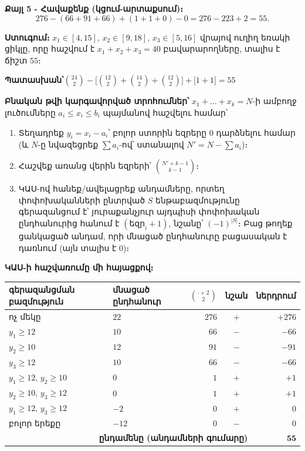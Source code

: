 \documentclass[11pt,a4paper]{article}
\newcommand{\answer}[1]{\begin{answerbox}\centering\textbf{Պատասխան՝}\quad #1\end{answerbox}}
\begin{document}
\textbf{Քայլ 5 - Հավաքենք (կցում-արտաքսում)։}
$$276-(66+91+66)+(1+1+0)-0=276-223+2=55.$$

\textbf{Ստուգում։} $x_1\in[4,15],\,x_2\in[9,18],\,x_3\in[5,16]$ վրայով ուղիղ եռակի ցիկլը, որը հաշվում
է $x_1+x_2+x_3=40$ բավարարողները, տալիս է ճիշտ $55$։ \checkmark

\answer{$\displaystyle \binom{24}{2}-\Big[\binom{12}{2}+\binom{14}{2}+\binom{12}{2}\Big]+\big[1+1\big]=55$}

\begin{methodbox}
\textbf{Բնական թվի կարգավորված տրոհումներ՝} $x_1+\dots+x_k=N$-ի ամբողջ լուծումները
$a_i\le x_i\le b_i$ պայմանով հաշվելու համար՝
\begin{enumerate}[nosep,leftmargin=2em]
  \item Տեղադրեք $y_i=x_i-a_i$՝ բոլոր ստորին եզրերը $0$ դարձնելու համար (և $N$-ը նվազեցրեք
        $\sum a_i$-ով՝ ստանալով $N'=N-\sum a_i$)։
  \item Հաշվեք առանց վերին եզրերի՝ $\binom{N'+k-1}{k-1}$։
  \item ԿԱՍ-ով հանեք/ավելացրեք անդամները, որտեղ փոփոխականների ընտրված $S$ ենթաբազմությունը
        գերազանցում է՝ յուրաքանչյուր այդպիսի փոփոխական ընդհանուրից հանում է $(\text{եզր}_i+1)$,
        նշանը՝ $(-1)^{|S|}$։ Բաց թողեք ցանկացած անդամ, որի մնացած ընդհանուրը բացասական է դառնում
        (այն տալիս է $0$)։
\end{enumerate}
\end{methodbox}

\medskip
\textbf{ԿԱՍ-ի հաշվառումը մի հայացքով։}
\begin{center}
\small
\renewcommand{\arraystretch}{1.15}
\begin{tabular}{@{}llrcr@{}}
\toprule
գերազանցման բազմություն & մնացած ընդհանուր & $\binom{\cdot+2}{2}$ & նշան & ներդրում\\
\midrule
ոչ մեկը               & $22$ & $276$ & $+$ & $+276$\\
$y_1\ge12$           & $10$ & $66$  & $-$ & $-66$\\
$y_2\ge10$           & $12$ & $91$  & $-$ & $-91$\\
$y_3\ge12$           & $10$ & $66$  & $-$ & $-66$\\
$y_1\ge12,\,y_2\ge10$& $0$  & $1$   & $+$ & $+1$\\
$y_2\ge10,\,y_3\ge12$& $0$  & $1$   & $+$ & $+1$\\
$y_1\ge12,\,y_3\ge12$& $-2$ & $0$   & $+$ & $0$\\
բոլոր երեքը           & $-12$& $0$   & $-$ & $0$\\
\midrule
\multicolumn{4}{r}{\textbf{ընդամենը (անդամների գումարը)}} & $\mathbf{55}$\\
\bottomrule
\end{tabular}
\end{center}
\end{document}
